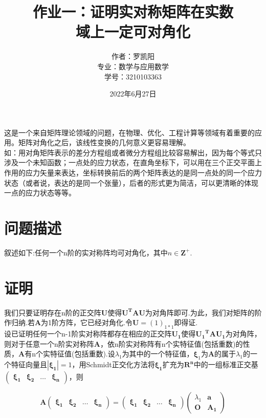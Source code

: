 \documentclass{ctexart}
\title{作业一：证明实对称矩阵在实数\\域上一定可对角化}
\author{作者：罗凯阳 \\专业：数学与应用数学\\学号：3210103363}
\date{2022年6月27日}
\begin{document}
\maketitle


这是一个来自矩阵理论领域的问题，在物理、优化、工程计算等领域有着重要的应用。矩阵对角化之后，该线性变换的几何意义更容易理解。\\
\indent 如：用对角矩阵表示的差分方程组或者微分方程组比较容易解出，因为每个等式只涉及一个未知函数；一点处的应力状态，在直角坐标下，可以用在三个正交平面上作用的应力矢量来表达，坐标转换前后的两个矩阵表达的是同一点处的同一个应力状态（或者说，表达的是同一个张量），后者的形式更为简洁，可以更清晰的体现一点的应力状态等等。
\section{问题描述}
叙述如下:任何一个n阶的实对称阵均可对角化，其中$n \in \boldsymbol{Z^+}$.

\section{证明}
我们只要证明存在n阶的正交阵$\boldsymbol{U}$使得$\boldsymbol{U^TAU}$为对角阵即可.为此，我们对矩阵的阶作归纳.若$\boldsymbol{A}$为1阶方阵，它已经对角化.令$\boldsymbol{U}=(1)_{1*1}$即得证.\\
\indent 设已证明任何一个n-1阶实对称阵都存在相应的正交阵$\boldsymbol{U_1}$使得$\boldsymbol{{U_1}^TAU_1}$为对角阵，则对于任意一个n阶实对称阵$\boldsymbol{A}$，依n阶实对称阵有n个实特征值(包括重数)的性质，$\boldsymbol{A}$有n个实特征值(包括重数).设${\lambda}_1$为其中的一个特征值，$\boldsymbol{\xi}_1$为$\boldsymbol{A}$的属于${\lambda}_1$的一个特征向量且$\boldsymbol{|{\xi}_1|}=1$，用Schmidt正交化方法将$\boldsymbol{{\xi}_1}$扩充为$\boldsymbol{R^n}$中的一组标准正交基$\boldsymbol{\left(\begin{array}{cccc}{\xi}_1 & {\xi}_2 & \ldots &{\xi}_n\end{array}\right)}$，则


\begin{equation}
\boldsymbol{A\left(\begin{array}{cccc}{\xi}_1 & {\xi}_2 & \ldots &{\xi}_n\end{array}\right)}=\boldsymbol{\left(\begin{array}{cccc}{\xi}_1 & {\xi}_2 & \ldots &{\xi}_n\end{array}\right)}\left(\begin{array}{ccc}{\lambda}_1 & \boldsymbol{a}\\ \boldsymbol{O} & \boldsymbol{A_1}\end{array}\right)
\end{equation}
\end{document}
